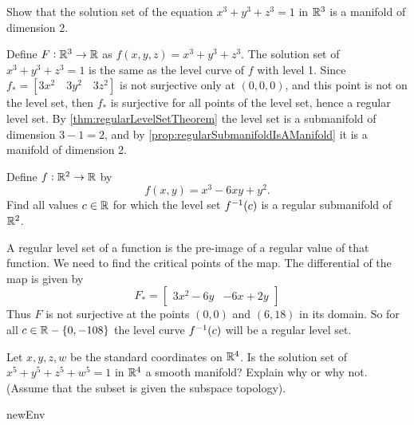 \begin{problem}
	Show that the solution set of the equation $ x^3 + y^3 + z^3 = 1 $ in $ \mathbb{R}^3 $ is a manifold of dimension 2. 
\end{problem}
\begin{solution}
	Define $ F: \mathbb{R}^3 \to \mathbb{R} $ as $ f(x,y,z) = x^3 + y^3 + z^3 $. The solution set of $ x^3 + y^3 + z^3 = 1 $ is the same as the level curve of $ f $ with level 1. Since $ f_* = \left[3x^2 \quad 3y^2 \quad 3z^2 \right] $ is not surjective only at $ (0,0,0) $, and this point is not on the level set, then $ f_* $ is surjective for all points of the level set, hence a regular level set. By \autoref{thm:regularLevelSetTheorem} the level set is a submanifold of dimension $ 3-1 =2 $, and by \autoref{prop:regularSubmanifoldIsAManifold} it is a manifold of dimension 2. 
\end{solution}

\begin{problem}
	Define $ f:\mathbb{R}^2 \to \mathbb{R} $ by
	\[ f(x,y) = x^3 - 6xy + y^2. \]
	Find all values $ c \in \mathbb{R} $ for which the level set $ f^{-1}(c) $ is a regular submanifold of $ \mathbb{R}^2 $.
\end{problem}
\begin{solution}
	A regular level set of a function is the pre-image of a regular value of that function. We need to find the critical points of the map. The differential of the map is given by
	\[ F_* = \begin{bmatrix}
		3x^2-6y & -6x + 2y
	\end{bmatrix} \]
	Thus $ F $ is not surjective at the points $ (0,0) $ and $ (6,18) $ in its domain. So for all $ c \in \mathbb{R} - \{0,-108\} $ the level curve $ f^{-1}(c) $ will be a regular level set. 
\end{solution}

\begin{problem}
	Let $ x,y,z,w $ be the standard coordinates on $ \mathbb{R}^4 $. Is the solution set of $ x^5 + y^5 + z^5 + w^5 = 1 $ in $ \mathbb{R}^4 $ a smooth manifold? Explain why or why not. (Assume that the subset is given the subspace topology).
\end{problem}
\begin{solution}
	newEnv
\end{solution}


